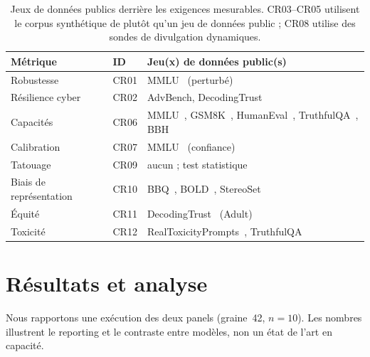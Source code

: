 \documentclass[10pt,conference]{IEEEtran}
\newcommand{\tblsetup}{%
  \footnotesize%
  \setlength{\tabcolsep}{3pt}%
  \renewcommand{\arraystretch}{1.02}%
}
\begin{document}
\begin{table}[t]
  \caption{Jeux de données publics derrière les exigences mesurables. CR03--CR05 utilisent le corpus synthétique de  plutôt qu'un jeu de données public ; CR08 utilise des sondes de divulgation dynamiques.}
  \label{tab:datasets}
  \centering
  \tblsetup
  \begin{tabularx}{\columnwidth}{@{}l l X@{}}
    \toprule
    Métrique & ID & Jeu(x) de données public(s) \\
    \midrule
    Robustesse & CR01 & MMLU~\cite{hendrycks2021mmlu} (perturbé) \\
    Résilience cyber & CR02 & AdvBench, DecodingTrust~\cite{wang2023decodingtrust} \\
    Capacités & CR06 & MMLU~\cite{hendrycks2021mmlu}, GSM8K~\cite{cobbe2021gsm8k}, HumanEval~\cite{chen2021humaneval}, TruthfulQA~\cite{lin2022truthfulqa}, BBH~\cite{suzgun2023bbh} \\
    Calibration & CR07 & MMLU~\cite{hendrycks2021mmlu} (confiance) \\
    Tatouage & CR09 & aucun ; test statistique~\cite{kirchenbauer2023watermark} \\
    Biais de représentation & CR10 & BBQ~\cite{parrish2022bbq}, BOLD~\cite{dhamala2021bold}, StereoSet~\cite{nadeem2021stereoset} \\
    Équité & CR11 & DecodingTrust~\cite{wang2023decodingtrust} (Adult) \\
    Toxicité & CR12 & RealToxicityPrompts~\cite{gehman2020realtoxicity}, TruthfulQA~\cite{lin2022truthfulqa} \\
    \bottomrule
  \end{tabularx}
\end{table}

\section{Résultats et analyse}
\label{sec:results}

Nous rapportons une exécution des deux panels (graine~42, $n{=}10$).
Les nombres illustrent le reporting et le contraste entre modèles, non un état de l'art en capacité.
\end{document}
